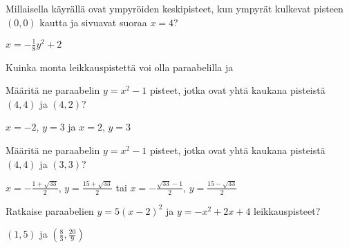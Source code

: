 \begin{tehtavasivu}
\begin{tehtava}
Millaisella käyrällä ovat ympyröiden keskipisteet, kun ympyrät kulkevat pisteen $(0, 0)$ kautta ja sivuavat suoraa $x=4$?
\begin{vastaus}
$x=-\frac{1}{8}y^2+2$
\end{vastaus}
\end{tehtava}

\begin{tehtava}
    Kuinka monta leikkauspistettä voi olla paraabelilla ja
    \begin{alakohdat}
    \end{alakohdat}
    \begin{vastaus}
        \begin{alakohdat}
        \end{alakohdat}
    \end{vastaus}
\end{tehtava}

\begin{tehtava}
Määritä ne paraabelin $y=x^2-1$ pisteet, jotka ovat yhtä kaukana pisteistä $(4, 4)$ ja $(4, 2)$?
\begin{vastaus}
$x=-2$, $y=3$ ja $x=2$, $y=3$
\end{vastaus}
\end{tehtava}

\begin{tehtava}
Määritä ne paraabelin $y=x^2-1$ pisteet, jotka ovat yhtä kaukana pisteistä $(4, 4)$ ja $(3, 3)$?
\begin{vastaus}
$x = -\frac{1+\sqrt{33}}{2}$,   $y = \frac{15+\sqrt{33}}{2}$ tai $x = -\frac{\sqrt{33}-1}{2}$,   $y = \frac{15-\sqrt{33}}{2}$
\end{vastaus}
\end{tehtava}

\begin{tehtava}
Ratkaise paraabelien $y=5(x-2)^2$  ja $y=-x^2+2x+4$ leikkauspisteet?
\begin{vastaus}
$(1, 5)$ ja $(\frac{8}{3}, \frac{20}{9})$
\end{vastaus}
\end{tehtava}


\end{tehtavasivu}
